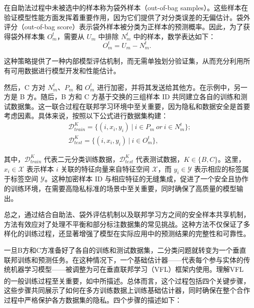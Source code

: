 在自助法过程中未被选中的样本称为袋外样本（out-of-bag samples）。这些样本在验证模型性能方面发挥着重要作用，因为它们提供了对分类误差的无偏估计。袋外评分（out-of-bag score）表示袋外样本被分类为正样本的预测概率。因此，为了获得袋外样本集 $O_{m}^{t}$，需要从 $U_{m}$ 中排除 $N_{m}^{t}$ 中的样本，数学表达如下：
\begin{equation}
	O_{m}^{t}=U_{m}-N_{m}^{t}.
\end{equation}

这种策略提供了一种内部模型评估机制，而无需单独划分验证集，从而充分利用所有可用数据进行模型开发和性能估计。

然后，C 方对 $N_{m}^{t}$、$P_{m}$ 和 $O_{m}^{t}$ 进行加密，并将其发送给其他方。在示例中，另一方是 B 方。随后，B 方和 C 方基于交换的三组样本 ID 共同建立各自的训练和测试数据集。这一联合过程在联邦学习环境中至关重要，因为隐私和数据安全是首要考虑因素。具体来说，按照以下公式进行数据集构建：
\begin{equation}
	\begin{split}
		&\mathsf{\mathcal{D}}_{train}^{K}=\{(i,x_{i},y_{i}) \ | \ i\in P_{m}\ or\ i\in N_{m}^{t}\};\\
		&\mathsf{\mathcal{D}}_{test}^{K}=\{(i,x_{i},y_{i}) \ | \ i\in O_{m}^{t}\},
	\end{split}
\end{equation}

其中，$\mathsf{\mathcal{D}}_{train}^{K}$ 代表二元分类训练数据，$\mathsf{\mathcal{D}}_{test}^{K}$ 代表测试数据，$K\in \{B,C\}$。这里，$x_{i}\in \mathsf{\mathcal{X}}$ 表示样本 $i$ 关联的特征向量来自特征空间 $\mathsf{\mathcal{X}}$，而 $y_{i}\in \mathsf{\mathcal{Y}}$ 表示相应的标签属于标签空间 $\mathsf{\mathcal{Y}}$。这种加密样本 ID 与相应特征的无缝集成，促进了一个安全且协作的训练环境，在需要高隐私标准的场景中至关重要，同时确保了高质量的模型输出。

总之，通过结合自助法、袋外评估机制以及联邦学习方之间的安全样本共享机制，方法有效应对了处理不平衡和部分标注数据集的常见挑战。这种方法不仅保证了多样化的训练过程，还显著增强了模型在实际应用中的预测结果的完整性和可靠性。

一旦B方和C方准备好了各自的训练和测试数据集，二分类问题就转变为一个垂直联邦训练和预测任务。在这种情况下，一个基础估计器——代表每个参与实体的传统机器学习模型——被调整为可在垂直联邦学习（VFL）框架内使用。理解VFL的一般训练过程至关重要，如\textsuperscript{\cite{yang2019federated}}中所描述。总体而言，这个过程包括四个关键步骤，这些步骤共同展示了如何在多方训练数据上训练基础估计器，同时确保在整个合作过程中严格保护各方数据集的隐私。四个步骤的描述如下：

